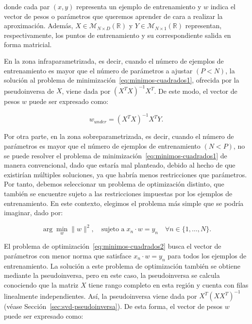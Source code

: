 donde cada par $(x, y)$ representa un ejemplo de entrenamiento y $w$ indica el vector de pesos o parámetros que queremos aprender de cara a realizar la aproximación. Además, $X \in \mathcal{M}_{N \times D}(\mathbb{R})$ y $Y\in \mathcal{M}_{N \times 1}(\mathbb{R})$ representan, respectivamente, los puntos de entrenamiento y su correspondiente salida en forma matricial.

En la zona infraparametrizada, es decir, cuando el número de ejemplos de entrenamiento es mayor que el número de parámetros a ajustar $(P < N)$, la solución al problema de minimización~\eqref{eq:minimos-cuadrados1}, ofrecida por la pseudoinversa de $X$, viene dada por ${(X^{T}X)}^{-1}X^{T}$. De este modo, el vector de pesos $w$ puede ser expresado como:

\begin{equation}
    w_{under} = {(X^{T}X)}^{-1}X^{T}Y.
\end{equation}

Por otra parte, en la zona sobreparametrizada, es decir, cuando el número de parámetros es mayor que el número de ejemplos de entrenamiento $(N < P)$, no se puede resolver el problema de minimización~\eqref{eq:minimos-cuadrados1} de manera convencional, dado que estaría mal planteado, debido al hecho de que existirían múltiples soluciones, ya que habría menos restricciones que parámetros. Por tanto, debemos seleccionar un problema de optimización distinto, que también se encuentre sujeto a las restricciones impuestas por los ejemplos de entrenamiento. En este contexto, elegimos el problema más simple que se podría imaginar, dado por:

\begin{equation}\label{eq:minimos-cuadrados2}
    \arg\min_{w}\| w \|^{2}, \quad \text{sujeto a} \; x_n \cdot w = y_n \quad \forall n \in \{1, \ldots, N\}.
\end{equation}

El problema de optimización~\eqref{eq:minimos-cuadrados2} busca el vector de parámetros con menor norma que satisface $x_n \cdot w = y_n$ para todos los ejemplos de entrenamiento. La solución a este problema de optimización también se obtiene mediante la pseudoinversa, pero en este caso, la pseudoinversa se calcula conociendo que la matriz $X$ tiene rango completo en esta región y cuenta con filas linealmente independientes. Así, la pseudoinversa viene dada por $X^{T}{(XX^{T})}^{-1}$ (véase Sección~\ref{sec:svd-pseudoinversa}). De esta forma, el vector de pesos $w$ puede ser expresado como:

